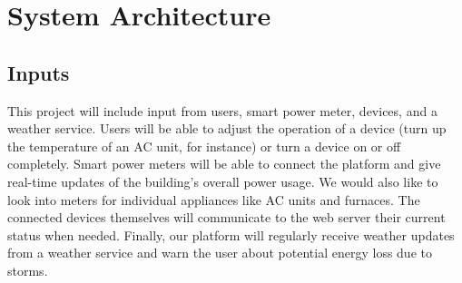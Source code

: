 \documentclass[letterpaper,12pt]{article}   %
\begin{document}
\section{System Architecture}
\subsection{Inputs}
This project will include input from users, smart power meter, devices, and a weather service. Users will be able to adjust the operation of a device (turn up the temperature of an AC unit, for instance) or turn a device on or off completely. Smart power meters will be able to connect the platform and give real-time updates of the building's overall power usage. We would also like to look into meters for individual appliances like AC units and furnaces. The connected devices themselves will communicate to the web server their current status when needed. Finally, our platform will regularly receive weather updates from a weather service and warn the user about potential energy loss due to storms.
\end{document}

